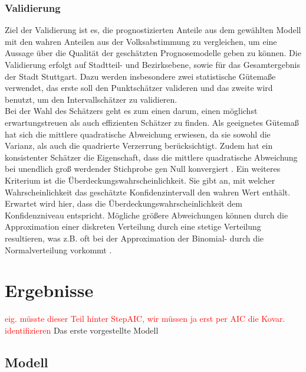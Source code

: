 \documentclass{Vorlage}
\begin{document}
\subsubsection{Validierung}
Ziel der Validierung ist es, die prognostizierten Anteile aus dem gewählten Modell mit den wahren Anteilen aus der 
Volksabstimmung \cite{Amt} zu vergleichen, um eine Aussage über die Qualität der geschätzten Prognosemodelle geben zu 
können. Die Validierung erfolgt auf Stadtteil- und Bezirksebene, sowie für das Gesamtergebnis der Stadt Stuttgart. Dazu 
werden insbesondere zwei statistische Gütemaße verwendet, das erste soll den Punktschätzer valideren und das zweite wird benutzt, um den Intervallschätzer zu validieren.\\
Bei der Wahl des Schätzers geht es zum einen darum, einen möglichst erwartungstreuen als auch effizienten Schätzer zu 
finden. Als geeignetes Gütemaß hat sich die mittlere quadratische Abweichung erwiesen, da sie sowohl die Varianz, als 
auch die quadrierte Verzerrung berücksichtigt. Zudem hat ein konsistenter Schätzer die Eigenschaft, dass die mittlere 
quadratische Abweichung bei unendlich groß werdender Stichprobe gen Null konvergiert \cite[p. 201]{HOG}. Ein weiteres 
Kriterium ist die Überdeckungswahrscheinlichkeit. Sie gibt an, mit welcher Wahrscheinlichkeit das geschätzte 
Konfidenzintervall den wahren Wert enthält. Erwartet wird hier, dass die Überdeckungswahrscheinlichkeit dem 
Konfidenzniveau entspricht. Mögliche größere Abweichungen können durch die Approximation einer diskreten Verteilung 
durch eine stetige Verteilung resultieren, was z.B. oft bei der Approximation der Binomial- durch die Normalverteilung 
vorkommt \cite[p. 102]{Int}.

\section{Ergebnisse}
\textcolor{red}{eig. müsste dieser Teil hinter StepAIC, wir müssen ja erst per AIC die Kovar. identifizieren}
Das erste vorgestellte Modell


\subsection{Modell}
\end{document}
